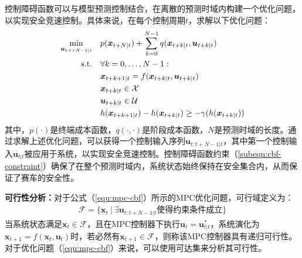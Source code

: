 控制障碍函数可以与模型预测控制结合，在离散的预测时域内构建一个优化问题，以实现安全竞速控制。具体来说，在每个控制周期$t$，求解以下优化问题：
\begin{subequations}
\begin{align}
    \min_{\boldsymbol{u}_{t:t+N-1 | t}}\quad & p(\boldsymbol{x}_{t+N|t}) + \sum_{k=0}^{N-1} q(\boldsymbol{x}_{t+k|t}, \boldsymbol{u}_{t+k|t})\\
    \text{s.t.}\quad &\forall k=0,\ldots,N-1: \notag \\
    & \boldsymbol{x}_{t+k+1|t} = f(\boldsymbol{x}_{t+k|t}, \boldsymbol{u}_{t+k|t})\\
    & \boldsymbol{x}_{t+k|t} \in \mathcal{X}\\
    & \boldsymbol{u}_{t+k|t} \in \mathcal{U}\\
    & h(\boldsymbol{x}_{t+k+1|t}) - h(\boldsymbol{x}_{t+k|t}) \geq -\gamma(h(\boldsymbol{x}_{t+k|t}))\label{subequ:cbf-constraint}
\end{align}
\label{equ:mpc-cbf}
\end{subequations}
其中，$p(\cdot)$是终端成本函数，$q(\cdot,\cdot)$是阶段成本函数，$N$是预测时域的长度。通过求解上述优化问题，可以获得一个控制输入序列$\boldsymbol{u}_{t:t+N-1|t}$，其中第一个控制输入$\boldsymbol{u}_{t|t}$被应用于系统，以实现安全竞速控制。控制障碍函数约束（\ref{subequ:cbf-constraint}）确保了在整个预测时域内，系统状态始终保持在安全集合内，从而保证了赛车的安全性。

\textbf{可行性分析：}对于公式（\ref{equ:mpc-cbf}）所示的MPC优化问题，可行域定义为：
\begin{equation}
\begin{aligned}
    \mathcal{F}=\{\boldsymbol{x}_t\ |\ \exists\boldsymbol{u}_{t:t+N-1|t} \text{使得约束条件成立}\}
\end{aligned}
\end{equation}
当系统状态满足$\boldsymbol{x}_t\in\mathcal{F}$，且在MPC控制器下执行$\boldsymbol{u}_t=\boldsymbol{u}_{t|t}^\ast$，系统演化为$\boldsymbol{x}_{t+1}=f(\boldsymbol{x}_t, \boldsymbol{u}_t)$时，若必然有$\boldsymbol{x}_{t+1}\in\mathcal{F}$，则称该MPC控制器具有递归可行性。对于优化问题（\ref{equ:mpc-cbf}）来说，可以使用可达集来分析其可行性。

